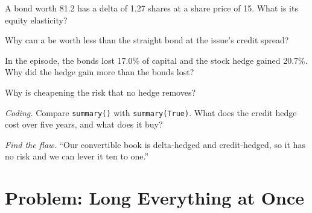 \begin{exercise}[$\star$]\label{exo:s2:convertible-arbitrage:3}
A bond worth 81.2 has a delta of 1.27 shares at a share price of 15. What is its equity elasticity?
\end{exercise}

\begin{exercise}[$\star\star$]\label{exo:s2:convertible-arbitrage:4}
Why can a  be worth less than the straight bond at the issue's credit spread?
\end{exercise}

\begin{exercise}[$\star\star$]\label{exo:s2:convertible-arbitrage:5}
In the episode, the bonds lost 17.0\% of capital and the stock hedge gained 20.7\%. Why did the hedge gain more than the bonds lost?
\end{exercise}

\begin{exercise}[$\star\star$]\label{exo:s2:convertible-arbitrage:6}
Why is cheapening the risk that no hedge removes?
\end{exercise}

\begin{exercise}[$\star\star\star$]\label{exo:s2:convertible-arbitrage:7}
\emph{Coding.} Compare \texttt{summary()} with \texttt{summary(True)}. What does the credit hedge cost over five years, and what does it buy?
\end{exercise}

\begin{exercise}[$\star\star\star$]\label{exo:s2:convertible-arbitrage:8}
\emph{Find the flaw.} ``Our convertible book is delta-hedged and credit-hedged, so it has no risk and we can lever it ten to one.''
\end{exercise}

\section{Problem: Long Everything at Once}

